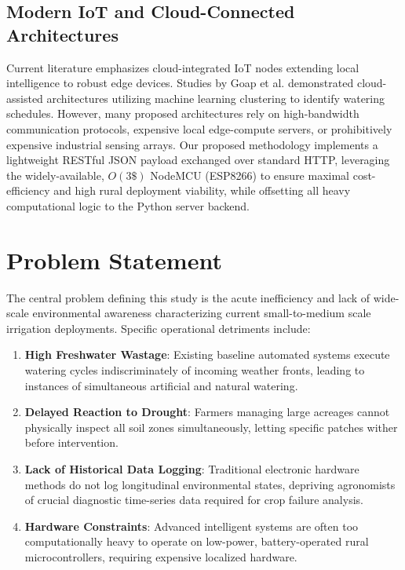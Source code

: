 \documentclass[conference]{IEEEtran}
\begin{document}
\subsection{Modern IoT and Cloud-Connected Architectures}
Current literature emphasizes cloud-integrated IoT nodes extending local intelligence to robust edge devices. Studies by Goap et al. \cite{b7} demonstrated cloud-assisted architectures utilizing machine learning clustering to identify watering schedules. However, many proposed architectures rely on high-bandwidth communication protocols, expensive local edge-compute servers, or prohibitively expensive industrial sensing arrays. Our proposed methodology implements a lightweight RESTful JSON payload exchanged over standard HTTP, leveraging the widely-available, $O(3\$)$ NodeMCU (ESP8266) to ensure maximal cost-efficiency and high rural deployment viability, while offsetting all heavy computational logic to the Python server backend.

\section{Problem Statement}

The central problem defining this study is the acute inefficiency and lack of wide-scale environmental awareness characterizing current small-to-medium scale irrigation deployments. Specific operational detriments include:

\begin{enumerate}
    \item \textbf{High Freshwater Wastage}: Existing baseline automated systems execute watering cycles indiscriminately of incoming weather fronts, leading to instances of simultaneous artificial and natural watering.
    \item \textbf{Delayed Reaction to Drought}: Farmers managing large acreages cannot physically inspect all soil zones simultaneously, letting specific patches wither before intervention.
    \item \textbf{Lack of Historical Data Logging}: Traditional electronic hardware methods do not log longitudinal environmental states, depriving agronomists of crucial diagnostic time-series data required for crop failure analysis.
    \item \textbf{Hardware Constraints}: Advanced intelligent systems are often too computationally heavy to operate on low-power, battery-operated rural microcontrollers, requiring expensive localized hardware. 
\end{enumerate}
\end{document}
